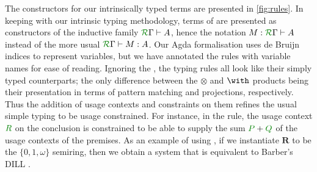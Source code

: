 \documentclass[submission,copyright,creativecommons]{eptcs}
\begin{document}


The constructors for our intrinsically typed terms are presented in \autoref{fig:rules}.
In keeping with our intrinsic typing methodology, terms of \name{} are presented as constructors of the inductive family $\ctx\Gamma{R} \vdash A$, hence the notation $M : \ctx\Gamma{R} \vdash A$ instead of the more usual $\ctx\Gamma{R} \vdash M : A$. 
Our Agda formalisation uses de Bruijn indices to represent variables, but we have annotated the rules with variable names for ease of reading. 
Ignoring the , the typing rules all look like their
simply typed counterparts; the only difference between the $\otimes$
and $\with$ products being their presentation in terms of pattern
matching and projections, respectively.
Thus the addition of usage contexts and constraints on them refines the usual simple typing to be usage constrained.
For instance, in the  rule, the usage context $\rescomment R$ on the conclusion is constrained to be able to supply the sum $\rescomment P + \rescomment Q$ of the usage contexts of the premises.
As an example of using \name{}, if we instantiate $\mathbf R$ to be the $\{0, 1, \omega\}$ semiring, then we obtain a system that is equivalent to Barber's DILL \cite{Barber1996}.


\end{document}
